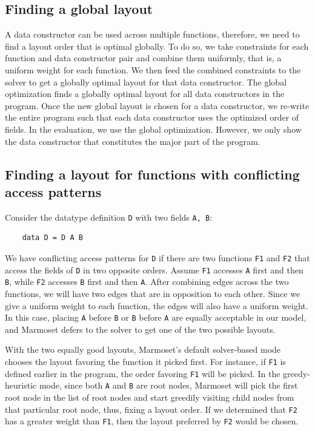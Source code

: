 \documentclass[acmsmall,review,anonymous]{acmart}\settopmatter{printfolios=true,printccs=false,printacmref=false}
\newcommand{\system}{{\sc Marmoset}\xspace}
\begin{document}
\subsection{Finding a global layout}
\label{design:global}

A data constructor can be used across multiple functions, therefore, we need to find a layout order that is optimal globally.
To do so, we take constraints for each function and data constructor pair and combine them uniformly, that is, a uniform weight for each function.
We then feed the combined constraints to the solver to get a globally optimal layout for that data constructor. The global optimization finds a globally optimal layout for all data constructors in the program. Once the new global layout is chosen for a data constructor, we re-write the 
entire program such that each data constructor uses the optimized order of fields.
In the evaluation, we use the global optimization. However, we only show the data constructor that constitutes the major part of the program.

\subsection{Finding a layout for functions with conflicting access patterns}
\label{design:conflicting-access-patterns}
Consider the datatype definition \lstinline|D| with two fields \lstinline|A, B|:
\begin{lstlisting}
    data D = D A B
\end{lstlisting}
We have conflicting access patterns for \lstinline|D|
if there are two functions \lstinline|F1| and \lstinline|F2| that access the fields of \lstinline|D| in two opposite orders.
Assume \lstinline|F1| accesses \lstinline|A| first and then \lstinline|B|, while \lstinline|F2|
accesses \lstinline|B| first and then \lstinline|A|. After combining edges across the two functions, we will have two edges that
are in opposition to each other. Since we give a uniform weight to each function, the edges will also have a uniform weight.
In this case,
placing \lstinline|A| before \lstinline|B| or \lstinline|B| before \lstinline|A| are equally acceptable in our model, and
\system defers to the solver to get one of the two possible layouts.

With the two equally good layouts, \system's default solver-based mode chooses the layout favoring the function it picked first. For instance, if \lstinline|F1| is defined earlier in the program, the order favoring \lstinline|F1| will be picked.
In the greedy-heuristic mode, since both \lstinline|A| and \lstinline|B| are root nodes, \system will pick the
first root node in the list of root nodes and start greedily visiting child nodes from that particular root node, thus, fixing a layout order.
If we determined that \lstinline|F2| has a greater weight than \lstinline|F1|, then the layout preferred by
\lstinline|F2| would be chosen.
\end{document}
